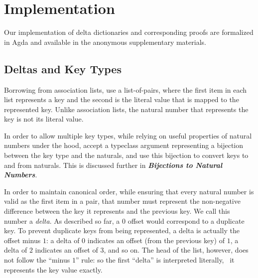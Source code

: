 \section{Implementation}
\label{sec:DD}



Our implementation of delta dictionaries and corresponding proofs are formalized in Agda and available in the anonymous supplementary materials.

\subsection{Deltas and Key Types}

Borrowing from association lists, \dds{} use a list-of-pairs, where the first item in each list represents a key and the second is the literal value that is mapped to the represented key.
%
Unlike association lists, the natural number that represents the key is not its literal value.

In order to allow multiple key types, while relying on useful properties of natural numbers under the hood, \dds{} accept a typeclass argument representing a bijection
%
between the key type and the naturals, and use this bijection to convert keys to and from naturals. This is discussed further in \emph{\textbf{Bijections to Natural Numbers}}.

In order to maintain canonical order, while ensuring that every natural number is valid as the first item in a pair, that number must represent the non-negative difference between the key it represents and the previous key.
%
We call this number a \emph{delta}. %
%
As described so far, a $0$ offset would correspond to a duplicate key.
%
To prevent duplicate keys from being represented, a delta is actually the offset minus $1$: a delta of $0$ indicates an offset (from the previous key) of $1$, a delta of $2$ indicates an offset of $3$, and so on.
%
The head of the list, however, does not follow the ``minus $1$'' rule: so the first ``delta'' is interpreted literally, \ie{}~it represents the key value exactly.

